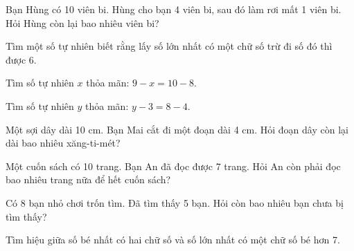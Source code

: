 \begin{ex}
Bạn Hùng có 10 viên bi. Hùng cho bạn 4 viên bi, sau đó làm rơi mất 1 viên bi. Hỏi Hùng còn lại bao nhiêu viên bi?
\end{ex}

\begin{ex}
Tìm một số tự nhiên biết rằng lấy số lớn nhất có một chữ số trừ đi số đó thì được 6.
\end{ex}

\begin{ex}
Tìm số tự nhiên $x$ thỏa mãn: $9 - x = 10 - 8$.
\end{ex}

\begin{ex}
Tìm số tự nhiên $y$ thỏa mãn: $y - 3 = 8 - 4$.
\end{ex}

\begin{ex}
Một sợi dây dài 10 cm. Bạn Mai cắt đi một đoạn dài 4 cm. Hỏi đoạn dây còn lại dài bao nhiêu xăng-ti-mét?
\end{ex}

\begin{ex}
Một cuốn sách có 10 trang. Bạn An đã đọc được 7 trang. Hỏi An còn phải đọc bao nhiêu trang nữa để hết cuốn sách?
\end{ex}

\begin{ex}
Có 8 bạn nhỏ chơi trốn tìm. Đã tìm thấy 5 bạn. Hỏi còn bao nhiêu bạn chưa bị tìm thấy?
\end{ex}

\begin{ex}
Tìm hiệu giữa số bé nhất có hai chữ số và số lớn nhất có một chữ số bé hơn 7.
\end{ex}

